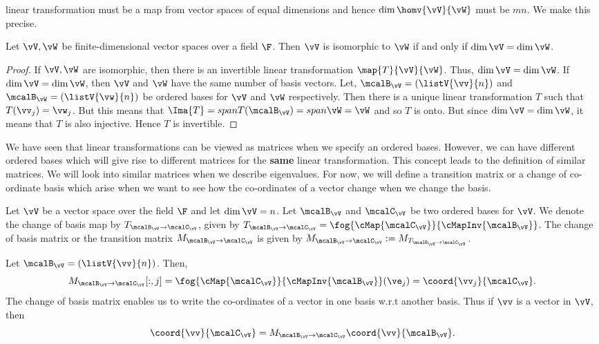 linear transformation must be a map from vector spaces of equal dimensions and hence $\dim{\homv{\vV}{\vW}}$
must be $mn$. We make this precise.
\begin{Proposition}
    Let $\vV,\vW$ be finite-dimensional vector spaces over a field $\F$. Then $\vV$ is isomorphic to $\vW$ if
    and only if $\dim{\vV} = \dim{\vW}$.
\end{Proposition}
\begin{proof}
    If $\vV,\vW$ are isomorphic, then there is an invertible linear transformation $\map{T}{\vV}{\vW}$. Thus,
    $\dim{\vV} = \dim{\vW}$.
    If $\dim{\vV} = \dim{\vW}$, then $\vV$ and $\vW$ have the same number of basis vectors. Let,
    $\mcalB_{\vV} = \left(\listV{\vv}{n}\right)$ and 
    $\mcalB_{\vW} = \left(\listV{\vw}{n}\right)$ be ordered bases for $\vV$ and $\vW$ respectively. Then there
    is a unique linear transformation $T$ such that $T(\vv_{j}) = \vw_{j}$. But this means that
    $\Ima{T} = span{T(\mcalB_{\vV})} = span{\vW} = \vW$ and so $T$ is onto. But since $\dim{\vV} = \dim{\vW}$, it
    means that $T$ is also injective. Hence $T$ is invertible.
\end{proof}

We have seen that linear transformations can be viewed as matrices when we specify an ordered bases. However,
we can have different ordered bases which will give rise to different matrices for the \textbf{same} linear
transformation. This concept leads to the definition of similar matrices. We will look into similar matrices
when we describe eigenvalues. For now, we will define a transition matrix or a change of co-ordinate basis
which arise when we want to see how the co-ordinates of a vector change when we change the basis.

\begin{Definition}[name=Change of Basis]
    Let $\vV$ be a vector space over the field $\F$ and let $\dim{\vV} = n$. Let $\mcalB_{\vV}$ and
    $\mcalC_{\vV}$ be two ordered bases for $\vV$. We denote the change of basis map by 
    $T_{\mcalB_{\vV}\to \mcalC_{\vV}}$,
    given by $T_{\mcalB_{\vV}\to \mcalC_{\vV}} = \fog{\cMap{\mcalC_{\vV}}}{\cMapInv{\mcalB_{\vV}}}$. 
    The change of basis
    matrix or the transition matrix $M_{\mcalB_{\vV}\to \mcalC_{\vV}}$ is given by 
    $M_{\mcalB_{\vV}\to \mcalC_{\vV}} := M_{T_{\mcalB_{\vV}\to \mcalC_{\vV}}}$.
\end{Definition}
\begin{Remark}
    Let $\mcalB_{\vV} = (\listV{\vv}{n})$. Then, \[M_{\mcalB_{\vV}\to \mcalC_{\vV}}[:,j] =
    \fog{\cMap{\mcalC_{\vV}}}{\cMapInv{\mcalB_{\vV}}}(\ve_{j}) = \coord{\vv_{j}}{\mcalC_{\vV}}.\] 
    The change of basis matrix enables us to write the co-ordinates of a vector in one basis w.r.t another basis.
    Thus if $\vv$ is a vector in $\vV$, then 
    \[\coord{\vv}{\mcalC_{\vV}} = M_{\mcalB_{\vV}\to \mcalC_{\vV}}\coord{\vv}{\mcalB_{\vV}}.\]
\end{Remark}
